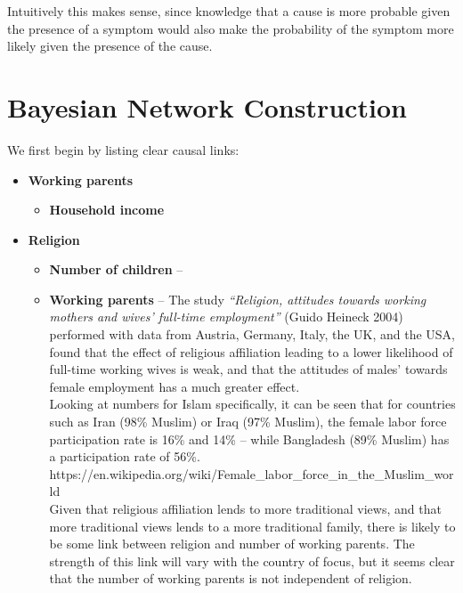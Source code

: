 Intuitively this makes sense, since knowledge that a cause is more probable given the presence of a symptom would also make the probability of the symptom more likely given the presence of the cause.

\section{Bayesian Network Construction}

We first begin by listing clear causal links:

\begin{itemize}
\item \textbf{Working parents}
\begin{itemize}
\item \textbf{Household income}
\end{itemize}
\item \textbf{Religion}
\begin{itemize}
\item \textbf{Number of children} -- 
\item \textbf{Working parents} -- The study \textit{``Religion, attitudes towards working mothers and wives' full-time employment''} (Guido Heineck 2004) performed with data from Austria, Germany, Italy, the UK, and the USA, found that the effect of religious affiliation leading to a lower likelihood of full-time working wives is weak, and that the attitudes of males' towards female employment has a much greater effect.\\Looking at numbers for Islam specifically, it can be seen that for countries such as Iran (98\% Muslim) or Iraq (97\% Muslim), the female labor force participation rate is 16\% and 14\% -- while Bangladesh (89\% Muslim) has a participation rate of 56\%.\\https://en.wikipedia.org/wiki/Female\_labor\_force\_in\_the\_Muslim\_world\\Given that religious affiliation lends to more traditional views, and that more traditional views lends to a more traditional family, there is likely to be some link between religion and number of working parents. The strength of this link will vary with the country of focus, but it seems clear that the number of working parents is not independent of religion.

\end{itemize}
\end{itemize}
